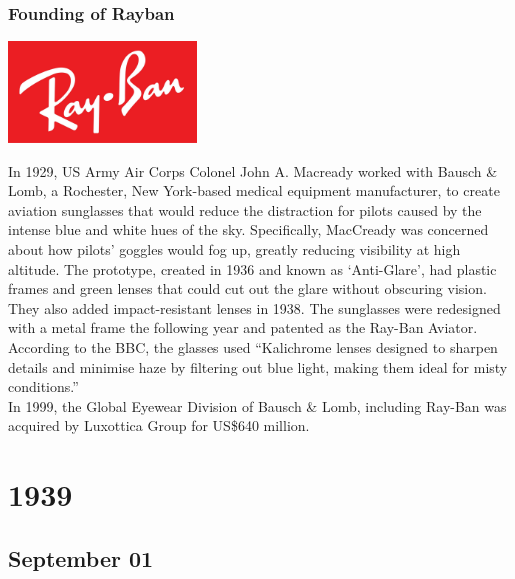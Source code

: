 \documentclass[11pt]{report}
\begin{document}
\subsection{Founding of Rayban}
\vspace{2mm}\begin{center}\includegraphics[width=5cm]{./img/raybanLogo.jpg}\end{center}
In 1929, US Army Air Corps Colonel John A. Macready worked with Bausch \& Lomb, a Rochester, New York-based medical equipment manufacturer, to create aviation sunglasses that would reduce the distraction for pilots caused by the intense blue and white hues of the sky. Specifically, MacCready was concerned about how pilots' goggles would fog up, greatly reducing visibility at high altitude. The prototype, created in 1936 and known as ‘Anti-Glare’, had plastic frames and green lenses that could cut out the glare without obscuring vision. They also added impact-resistant lenses in 1938. The sunglasses were redesigned with a metal frame the following year and patented as the Ray-Ban Aviator. According to the BBC, the glasses used “Kalichrome lenses designed to sharpen details and minimise haze by filtering out blue light, making them ideal for misty conditions.”\\
\indent In 1999, the Global Eyewear Division of Bausch \& Lomb, including Ray-Ban was acquired by Luxottica Group for US\$640 million.

\chapter{1939}
\section{September 01}
\end{document}
